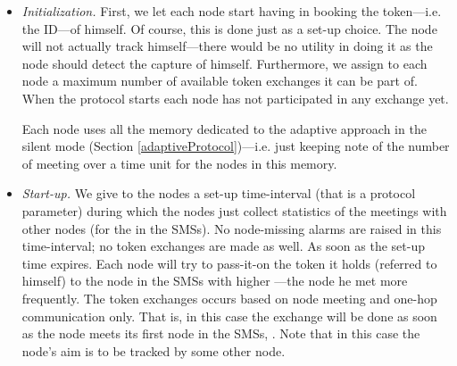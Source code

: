 \documentclass{IEEEconf}
\begin{document}
\begin{itemize}

\item \textit{Initialization.} First, we let each node start having in booking the token---i.e. the ID---of himself. Of course, this is done just as a set-up choice. The node will not actually track himself---there would be no utility in doing it as the node should detect the capture of himself. Furthermore, we assign to each node a maximum number of available token exchanges it can be part of. When the protocol starts each node has not participated in any exchange yet.

Each node uses all the memory dedicated to the adaptive approach in the silent mode (Section \ref{adaptiveProtocol})---i.e. just keeping note of the number of meeting over a time unit for the nodes in this memory.


\item \textit{Start-up.} We give to the nodes a set-up time-interval (that is a protocol parameter) during which the nodes just collect statistics of the meetings with other nodes (for the  in the SMSs). No node-missing alarms are raised in this time-interval; no token exchanges are made as well.
As soon as the set-up time expires. Each node will try to pass-it-on the token it holds (referred to himself) to the node in the SMSs with higher ---the node he met more frequently. The token exchanges occurs based on node meeting and one-hop communication only. That is, in this case the exchange will be done as soon as the node meets its first node in the SMSs, .
Note that in this case the node's aim is to be tracked by some other node.


\end{itemize}
\end{document}

